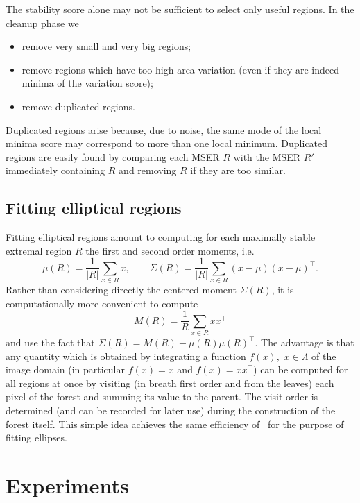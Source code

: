 \documentclass{article}
\begin{document}
The stability score alone may not be sufficient to select only useful regions. In the cleanup phase we
\begin{itemize}
\item remove very small and very big regions;
\item remove regions which have too high area variation (even if they are indeed minima of the variation score);
\item remove duplicated regions.
\end{itemize}
Duplicated regions arise because, due to noise, the same mode of the local minima score may correspond to more than one local minimum. Duplicated regions are easily found by comparing each MSER $R$ with the MSER $R'$ immediately containing $R$ and removing $R$ if they are too similar.

\subsection{Fitting elliptical regions}\label{sect:er.int}

Fitting elliptical regions amount to computing for each maximally stable extremal region $R$ the first and second order moments, i.e.
\[
 \mu(R) = \frac{1}{|R|} \sum_{x\in R} x,
 \qquad
 \Sigma(R) = \frac{1}{|R|} \sum_{x\in R} (x-\mu)(x-\mu)^\top.
\]
Rather than considering directly the centered moment $\Sigma(R)$, it is computationally more convenient to compute
\[
  M(R) = \frac{1}{R} \sum_{x\in R}xx^\top
\]
and use the fact that $\Sigma(R) = M(R) - \mu(R)\mu(R)^\top$. The advantage is that any quantity which is obtained by integrating a function $f(x),$ $x\in\Lambda$ of the image domain (in particular $f(x)=x$ and $f(x)=xx^\top$) can be computed for all regions at once by visiting (in breath first order and from the leaves) each pixel of the forest and summing its value to the parent. The visit order is  determined (and can be recorded for later use) during the construction of the forest itself. This simple idea achieves the same efficiency of~\cite{murphy-chutorian06n-tree} for the purpose of fitting ellipses.

\section{Experiments}\label{sect:exp}
\end{document}
